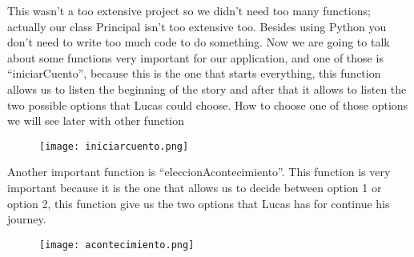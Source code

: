\documentclass[12pt,letterpaper]{article}
\begin{document}
\begin{raggedleft}
This wasn't a too extensive project so we didn't need too many functions; actually our class Principal isn't too extensive too. Besides using Python you don't need to write too much code to do something. Now we are going to talk about some functions very important for our application, and one of those is “iniciarCuento”, because this is the one that starts everything, this function allows us to listen the beginning of the story and after that it allows to listen the two possible options that Lucas could choose.  How to choose one of those options we will see later with other function
\end{raggedleft}

\begin{figure}[h]
\begin{center}
\texttt{[image: iniciarcuento.png]}\\
\end{center}
\end{figure}

\begin{raggedleft}
Another important function is “eleccionAcontecimiento”.
This function is very important because it is the one that allows us to decide between option 1 or option 2, this function give us the two options that Lucas has for continue his journey.
\end{raggedleft}

\begin{figure}[h]
\begin{center}
\texttt{[image: acontecimiento.png]}\\
\end{center}
\end{figure}
\end{document}
